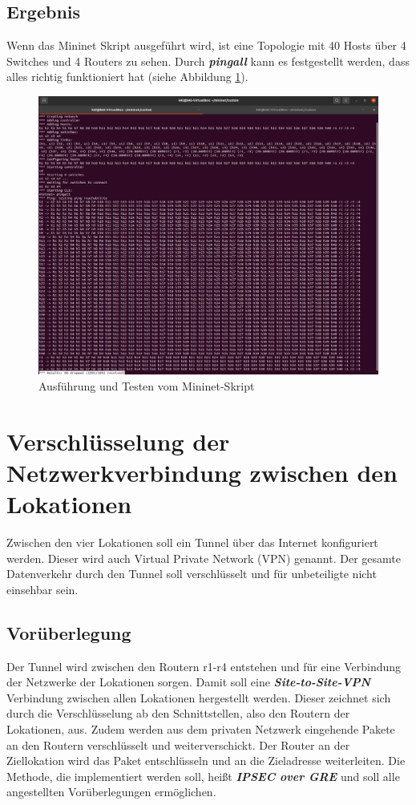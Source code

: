 \documentclass[fontsize=12pt,paper=a4,open=any,parskip=half,
  twoside=false,toc=listof,toc=bibliography,fleqn,leqno,
  captions=nooneline,captions=tableabove,british]{scrbook}
\begin{document}
\subsection{Ergebnis}
Wenn das Mininet Skript ausgeführt wird, ist eine Topologie mit 40 Hosts über 4 Switches und 4 Routers zu sehen. Durch \textit{\textbf{pingall}} kann es festgestellt werden, dass alles richtig funktioniert hat (siehe Abbildung \ref{pingall}).

\begin{figure}[H]
 \centering
 \includegraphics[width=1.0\textwidth]{Bilder/pingall}
 \captionsetup{justification=centering,margin=1cm}
 \caption{Ausführung und Testen vom Mininet-Skript}
 \label{pingall}
\end{figure}

\section{Verschlüsselung der Netzwerkverbindung zwischen den Lokationen}
Zwischen den vier Lokationen soll ein Tunnel über das Internet konfiguriert werden. Dieser wird auch Virtual Private Network (VPN) genannt. Der gesamte Datenverkehr durch den Tunnel soll verschlüsselt und für unbeteiligte nicht einsehbar sein.

\subsection{Vorüberlegung}
Der Tunnel wird zwischen den Routern r1-r4 entstehen und für eine Verbindung der Netzwerke der Lokationen sorgen. Damit soll eine \textit{\textbf{Site-to-Site-VPN}} Verbindung zwischen allen Lokationen hergestellt werden. Dieser zeichnet sich durch die Verschlüsselung ab den Schnittstellen, also den Routern der Lokationen, aus. Zudem werden aus dem privaten Netzwerk eingehende Pakete an den Routern verschlüsselt und weiterverschickt. Der Router an der Ziellokation wird das Paket entschlüsseln und an die Zieladresse weiterleiten. Die Methode, die implementiert werden soll, heißt \textit{\textbf{IPSEC over GRE}} und soll alle angestellten Vorüberlegungen ermöglichen.
\end{document}
